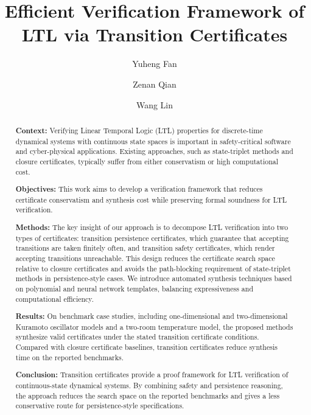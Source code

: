\documentclass[a4paper,fleqn]{cas-sc}
\theoremstyle{definition}
\begin{document}
\let\WriteBookmarks\relax
\def\floatpagepagefraction{1}
\def\textpagefraction{.001}


\title[mode=title]{Efficient Verification Framework of LTL via Transition Certificates}

\author{Yuheng Fan}
\author{Zenan Qian}
\author{Wang Lin}
\cormark[1]



\begin{abstract}
\noindent\textbf{Context:} Verifying Linear Temporal Logic (LTL) properties for discrete-time dynamical systems with continuous state spaces is important in safety-critical software and cyber-physical applications. Existing approaches, such as state-triplet methods and closure certificates, typically suffer from either conservatism or high computational cost.\par
\noindent\textbf{Objectives:} This work aims to develop a verification framework that reduces certificate conservatism and synthesis cost while preserving formal soundness for LTL verification.\par
\noindent\textbf{Methods:} The key insight of our approach is to decompose LTL verification into two types of certificates: transition persistence certificates, which guarantee that accepting transitions are taken finitely often, and transition safety certificates, which render accepting transitions unreachable. This design reduces the certificate search space relative to closure certificates and avoids the path-blocking requirement of state-triplet methods in persistence-style cases. We introduce automated synthesis techniques based on polynomial and neural network templates, balancing expressiveness and computational efficiency.\par
\noindent\textbf{Results:} On benchmark case studies, including one-dimensional and two-dimensional Kuramoto oscillator models and a two-room temperature model, the proposed methods synthesize valid certificates under the stated transition certificate conditions. Compared with closure certificate baselines, transition certificates reduce synthesis time on the reported benchmarks.\par
\noindent\textbf{Conclusion:} Transition certificates provide a proof framework for LTL verification of continuous-state dynamical systems. By combining safety and persistence reasoning, the approach reduces the search space on the reported benchmarks and gives a less conservative route for persistence-style specifications.
\end{abstract}
\end{document}
